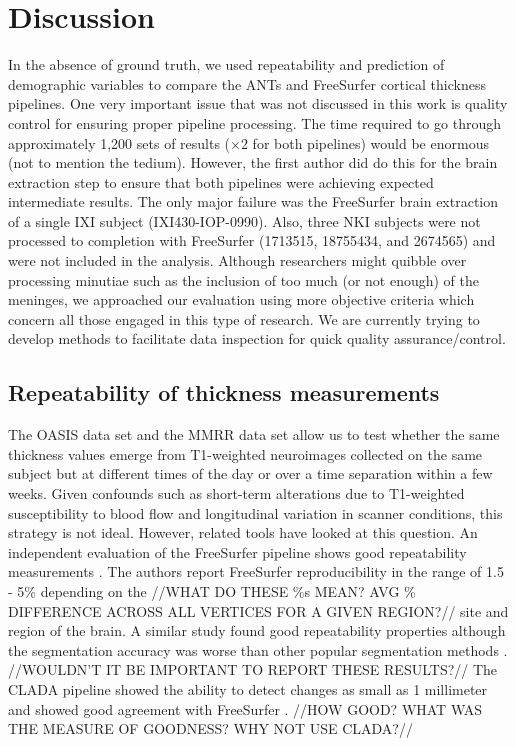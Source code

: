 \section{Discussion}
In the absence of ground truth, we used repeatability and prediction of
demographic variables to compare the ANTs and FreeSurfer cortical 
thickness pipelines.  One very important
issue that was not discussed in this work is quality control for
ensuring proper pipeline processing.  The time required to go through 
approximately 1,200 sets of results ($\times 2$ for both pipelines) would be
enormous (not to mention the tedium).  However, the first
author did do this for the brain extraction step to ensure that both pipelines
were achieving expected intermediate results.  The only
major failure was the FreeSurfer brain extraction of
a single IXI subject (IXI430-IOP-0990).
Also, three NKI subjects were not processed to completion
with FreeSurfer (1713515, 18755434, and 2674565) and were not included in the analysis.
Although  researchers might quibble over processing minutiae such as the
inclusion of too much (or not enough) of the meninges, we approached
our evaluation using more objective criteria which concern all those
engaged in this type of research.  We are currently trying to develop methods
to facilitate data inspection for quick quality assurance/control.


\subsection{Repeatability of thickness measurements}
The OASIS data set 
and the MMRR data set allow us to test whether the same
thickness values emerge from T1-weighted
neuroimages collected on the same subject but at different times of
the day or over a time separation within a few weeks.  Given confounds 
such as short-term alterations due to T1-weighted susceptibility to
blood flow \cite{Franklin2013,Salgado-Pineda2006,Yamasue2007} and
longitudinal variation in scanner conditions, 
this strategy is not ideal.  However, related
tools have looked at this question. 
An independent evaluation of the FreeSurfer pipeline shows good
repeatability measurements \cite{jovicich2013}. The authors report
FreeSurfer reproducibility in the range of 1.5 - 5\% depending on the
//WHAT DO THESE \%s MEAN? AVG \% DIFFERENCE ACROSS ALL VERTICES FOR A GIVEN REGION?//
site and region of the brain.  A similar study found good
repeatability properties although the segmentation accuracy was worse 
than other popular segmentation methods \cite{eggert2012}.
//WOULDN'T IT BE IMPORTANT TO REPORT THESE RESULTS?//
The CLADA pipeline showed the ability to detect
changes as small as 1 millimeter and showed good agreement with
FreeSurfer \cite{nakamura2011}.
//HOW GOOD?  WHAT WAS THE MEASURE OF GOODNESS?  WHY NOT USE CLADA?//

